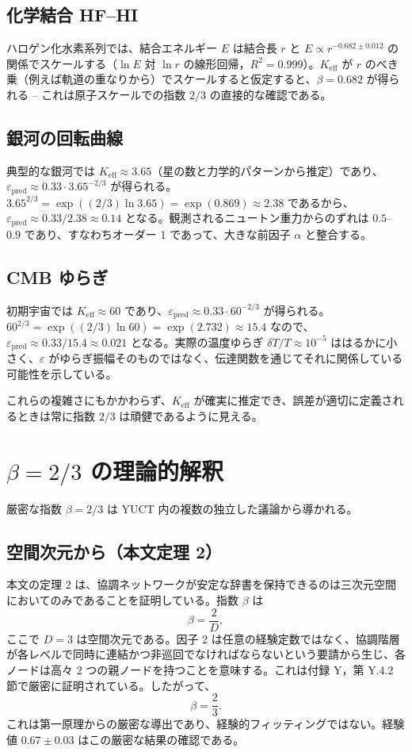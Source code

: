 \documentclass[11pt,a4paper]{article}
\newcommand{\Keff}{K_{\mathrm{eff}}}
\newcommand{\eps}{\varepsilon}
\begin{document}
	\subsection*{化学結合 HF–HI}
	ハロゲン化水素系列では、結合エネルギー \(E\) は結合長 \(r\) と \(E \propto r^{-0.682 \pm 0.012}\) の関係でスケールする（\(\ln E\) 対 \(\ln r\) の線形回帰，\(R^2 = 0.999\)）。\(\Keff\) が \(r\) のべき乗（例えば軌道の重なりから）でスケールすると仮定すると、\(\beta = 0.682\) が得られる – これは原子スケールでの指数 \(2/3\) の直接的な確認である。
	
	\subsection*{銀河の回転曲線}
	典型的な銀河では \(\Keff \approx 3.65\)（星の数と力学的パターンから推定）であり、\(\eps_{\text{pred}} \approx 0.33 \cdot 3.65^{-2/3}\) が得られる。\(3.65^{2/3} = \exp((2/3)\ln 3.65) = \exp(0.869) \approx 2.38\) であるから、\(\eps_{\text{pred}} \approx 0.33/2.38 \approx 0.14\) となる。観測されるニュートン重力からのずれは \(0.5\)–\(0.9\) であり、すなわちオーダー 1 であって、大きな前因子 \(\alpha\) と整合する。
	
	\subsection*{CMB ゆらぎ}
	初期宇宙では \(\Keff \approx 60\) であり、\(\eps_{\text{pred}} \approx 0.33 \cdot 60^{-2/3}\) が得られる。\(60^{2/3} = \exp((2/3)\ln 60) = \exp(2.732) \approx 15.4\) なので、\(\eps_{\text{pred}} \approx 0.33/15.4 \approx 0.021\) となる。実際の温度ゆらぎ \(\delta T/T \approx 10^{-5}\) ははるかに小さく、\(\eps\) がゆらぎ振幅そのものではなく、伝達関数を通じてそれに関係している可能性を示している。
	
	これらの複雑さにもかかわらず、\(\Keff\) が確実に推定でき、誤差が適切に定義されるときは常に指数 \(2/3\) は頑健であるように見える。
	
	\section{\(\beta = 2/3\) の理論的解釈}
	\label{sec:derivation}
	
	厳密な指数 \(\beta = 2/3\) は YUCT 内の複数の独立した議論から導かれる。
	
	\subsection*{空間次元から（本文定理 2）}
	本文の定理 2 は、協調ネットワークが安定な辞書を保持できるのは三次元空間においてのみであることを証明している。指数 \(\beta\) は
	\[
	\beta = \frac{2}{D},
	\]
	ここで \(D = 3\) は空間次元である。因子 2 は任意の経験定数ではなく、協調階層が各レベルで同時に連結かつ非巡回でなければならないという要請から生じ、各ノードは高々 2 つの親ノードを持つことを意味する。これは付録 Y，第 Y.4.2 節で厳密に証明されている。したがって、
	\[
	\beta = \frac{2}{3}.
	\]
	これは第一原理からの厳密な導出であり、経験的フィッティングではない。経験値 \(0.67 \pm 0.03\) はこの厳密な結果の確認である。
	
\end{document}
